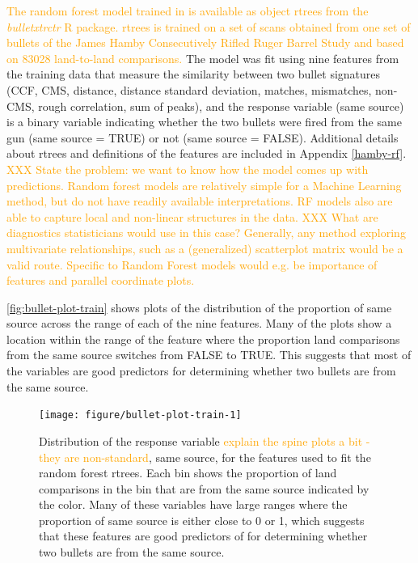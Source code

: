 \documentclass[AMS,STIX2COL]{WileyNJD-v2}\usepackage[]{graphicx}\usepackage[]{color}
\newenvironment{knitrout}{}{} %
\newcommand{\hh}[1]{\textcolor{orange}{#1}}
\begin{document}
{\hh{The random forest model trained in \citet{hare:2016} is available as object rtrees from the \emph{bulletxtrctr} R package. rtrees is trained on a set of scans obtained from one set of bullets of the James Hamby Consecutively Rifled Ruger Barrel Study \citep{hamby:2009} and based on 83028 land-to-land comparisons.}
The model was fit using nine features from the training data that measure the similarity between two bullet signatures (CCF, CMS, distance, distance standard deviation, matches, mismatches, non-CMS, rough correlation, sum of peaks), and the response variable (same source) is a binary variable indicating whether the two bullets were fired from the same gun (same source = TRUE) or not (same source = FALSE). Additional details about rtrees and definitions of the features are included in Appendix \ref{hamby-rf}.
\hh{XXX State the problem: we want to know how the model comes up with predictions. Random forest models are relatively simple for a Machine Learning method, but do not have readily available interpretations. RF models also are able to capture local and non-linear structures in the data.
XXX What are diagnostics statisticians would use in this case?
Generally, any method exploring multivariate relationships, such as a (generalized) scatterplot matrix would be a valid route.
Specific to Random Forest models would e.g. be importance of features and parallel coordinate plots.  }

\autoref{fig:bullet-plot-train} shows plots of the distribution of the proportion of same source across the range of each of the nine features. Many of the plots show a location within the range of the feature where the proportion land comparisons from the same source switches from FALSE to TRUE. This suggests that most of the variables are good predictors for determining whether two bullets are from the same source.

\begin{figure}[!t]
\begin{knitrout}
\color{fgcolor}
\texttt{[image: figure/bullet-plot-train-1]} 

\end{knitrout}
\caption{Distribution of the response variable \hh{explain the spine plots \cite{hummel:1996} a bit - they are non-standard}, same source, for the features used to fit the random forest rtrees. Each bin shows the proportion of land comparisons in the bin that are from the same source indicated by the color. Many of these variables have large ranges where the proportion of same source is either close to 0 or 1, which suggests that these features are good predictors of for determining whether two bullets are from the same source.}
\label{fig:bullet-plot-train}
\end{figure}

}
\end{document}
